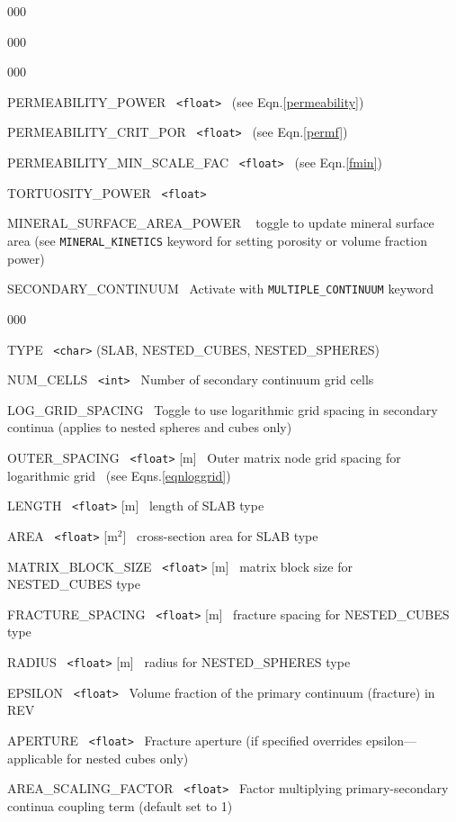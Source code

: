 \begin{deflist}{000}
\begin{deflist}{000}
\begin{deflist}{000}
\end{deflist}
\item[\keyend]
\item[PERMEABILITY\_POWER] \ {\tt <float>} \ (see Eqn.\eqref{permeability})
\item[PERMEABILITY\_CRIT\_POR] \ {\tt <float>} \ (see Eqn.\eqref{permf})
\item[PERMEABILITY\_MIN\_SCALE\_FAC] \ {\tt <float>} \ (see Eqn.\eqref{fmin})
\item[TORTUOSITY\_POWER] \ {\tt <float>}
\item[MINERAL\_SURFACE\_AREA\_POWER] ~ toggle to update mineral surface area (see {\tt MINERAL\_KINETICS} keyword for setting porosity or volume fraction power)
\item[SECONDARY\_CONTINUUM] \ Activate with {\tt MULTIPLE\_CONTINUUM} keyword 
\begin{deflist}{000}
\item[TYPE] \ {\tt <char>} (SLAB, NESTED\_CUBES, NESTED\_SPHERES)
\item[NUM\_CELLS] \ {\tt <int>} \ Number of secondary continuum grid cells
\item[LOG\_GRID\_SPACING] \ Toggle to use logarithmic grid spacing in secondary continua (applies to nested spheres and cubes only)
\item[OUTER\_SPACING] \ {\tt <float>} [m] \ Outer matrix node grid spacing for logarithmic grid \ (see Eqns.\eqref{eqnloggrid})
\item[LENGTH] \ {\tt <float>} [m] \ length of SLAB type
\item[AREA] \ {\tt <float>} [m$^2$] \ cross-section area for SLAB type
\item[MATRIX\_BLOCK\_SIZE] \ {\tt <float>} [m] \ matrix block size for NESTED\_CUBES type
\item[FRACTURE\_SPACING] \ {\tt <float>} [m] \ fracture spacing for NESTED\_CUBES type
\item[RADIUS] \ {\tt <float>} [m] \ radius for NESTED\_SPHERES type
\item[EPSILON] \ {\tt <float>} \ Volume fraction of the primary continuum (fracture) in REV
\item[APERTURE] \ {\tt <float>} \ Fracture aperture (if specified overrides epsilon---applicable for nested cubes only)
\item[AREA\_SCALING\_FACTOR] \ {\tt <float>} \ Factor multiplying primary-secondary continua coupling term (default set to 1)
\end{deflist}
\item[\keyend]
\end{deflist}
\item[\keyend]
\end{deflist}

